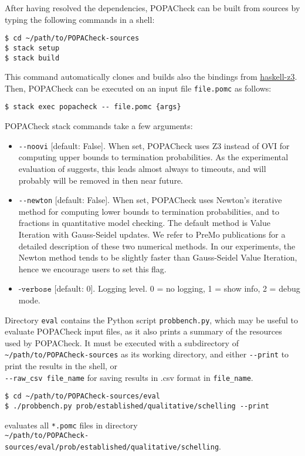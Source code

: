 \documentclass[9pt,a4paper]{article}
\begin{document}
After having resolved the dependencies, POPACheck can be built from sources by typing the following commands in a shell:
\begin{verbatim}
$ cd ~/path/to/POPACheck-sources
$ stack setup
$ stack build
\end{verbatim}
This command automatically clones and builds also the bindings from \href{https://github.com/michiari/haskell-z3}{haskell-z3}.
Then, POPACheck can be executed on an input file \verb|file.pomc| as follows:
\begin{verbatim}
$ stack exec popacheck -- file.pomc {args}
\end{verbatim}

POPACheck stack commands take a few arguments:
\begin{itemize}
    \item \verb|--noovi| [default: False]. When set, POPACheck uses Z3 instead of OVI for computing upper bounds to termination probabilities. As the experimental evaluation of \cite{POPACheck} suggests, this leads almost always to timeouts, and will probably will be removed in then near future.
    \item \verb|--newton| [default: False]. When set, POPACheck uses Newton's iterative method for computing lower bounds to termination probabilities, and to fractions in quantitative model checking. The default method is Value Iteration with Gauss-Seidel updates. We refer to PreMo publications \cite{WojtczakE07,Wojtczak09} for a detailed description of these two numerical methods. In our experiments, the Newton method tends to be slightly faster than Gauss-Seidel Value Iteration, hence we encourage users to set this flag.
    \item $\texttt{-verbose}$ [default: 0]. Logging level. 0 = no logging, 1 = show info, 2 = debug mode.
\end{itemize}

Directory \verb|eval| contains the Python script \verb|probbench.py|,
which may be useful to evaluate POPACheck input files, as it also prints
a summary of the resources used by POPACheck.
It must be executed with a subdirectory of \verb|~/path/to/POPACheck-sources| as its working directory, and either \verb|--print| to print the results in the shell, or \\ \verb|--raw_csv file_name| for saving results in .csv format in \verb|file_name|.

\begin{verbatim}
$ cd ~/path/to/POPACheck-sources/eval
$ ./probbench.py prob/established/qualitative/schelling --print
\end{verbatim}
evaluates all \verb|*.pomc| files in directory \\ \verb|~/path/to/POPACheck-sources/eval/prob/established/qualitative/schelling|.
\end{document}
